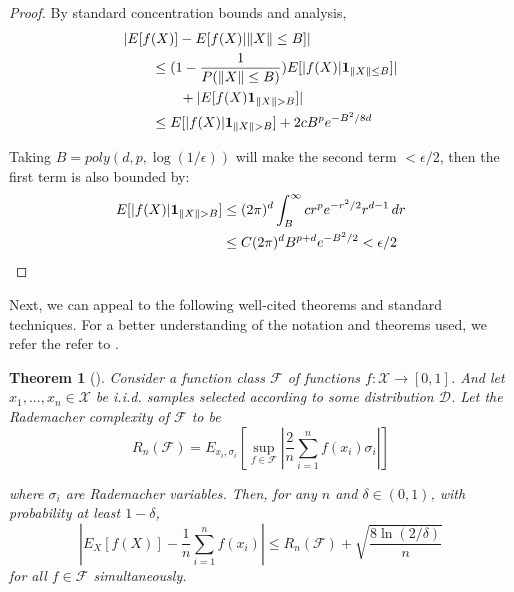 \documentclass{article}
\newtheorem{theorem}{Theorem}[section]
\newcommand{\Authornote}[2]{{\sf\color{red}{[#1: #2]}}}
\newcommand{\Authornote}[2]{}
\newcommand{\Snote}{\Authornote{S}}
\begin{document}
\begin{proof}
By standard concentration bounds and analysis, 
\begin{align*}
& |E[f(X)] - E[f(X)| \|X\|\leq B]| \\
& \qquad \leq (1- \frac{1}{P(\|X\|\leq B)}) E[|f(X)|{\bf 1}_{\|X\|\leq B}]| \\
& \qquad \qquad + |E[f(X){\bf 1}_{\|X\|>B}]| \\
& \qquad \leq E[|f(X)|{\bf 1}_{\|X\|>B}] + 2cB^pe^{-B^2/8d}
\end{align*}
\Snote{Check the first term, prob is $< 1,$ making the first term
  negative. Also, in the terms in the proof, you don't want
  conditioning, but rather an and with an indicator of the event.}


Taking $B = poly(d,p,\log(1/\epsilon))$ will make the second term $< \epsilon/2$, then the first term is also bounded by:
\begin{align*}
  E[|f(X)|{\bf 1}_{\|X\|>B}] &\leq (2\pi)^d \int_B^\infty cr^pe^{-r^2/2}r^{d-1}\,dr \\
                             &\leq C(2\pi)^dB^{p+d}e^{-B^2/2} < \epsilon/2
\end{align*}
\end{proof}

Next, we can appeal to the following well-cited theorems and standard techniques. For a better understanding of the notation and theorems used, we refer the refer to \cite{bartlett2002rademacher}.
%
\begin{theorem}[\cite{bartlett2002rademacher}]
Consider a function class $\mathcal{F}$ of functions $f : \mathcal{X} \to [0,1]$. And let $ x_1,...,x_n \in \mathcal{X}$ be i.i.d. samples selected according to some distribution $\mathcal{D}$. Let the Rademacher complexity of $\mathcal{F}$ to be 
\[R_n (\mathcal{F}) = E_{x_i,\sigma_i}\left[\sup_{f \in \mathcal{F}} \left|\frac{2}{n}\sum_{i=1}^nf(x_i)\sigma_i\right|\right]\]

where $\sigma_i$ are Rademacher variables. Then, for any $n$ and $\delta \in (0,1)$, with probability at least $1-\delta$, 
\[|E_{X}[f(X)]  - \frac{1}{n}\sum_{i=1}^n f(x_i)| \leq R_n(\mathcal{F}) + \sqrt{\frac{8\ln(2/\delta)}{n}} \]
for all $f \in\mathcal{F}$ simultaneously.
\end{theorem}
\end{document}
